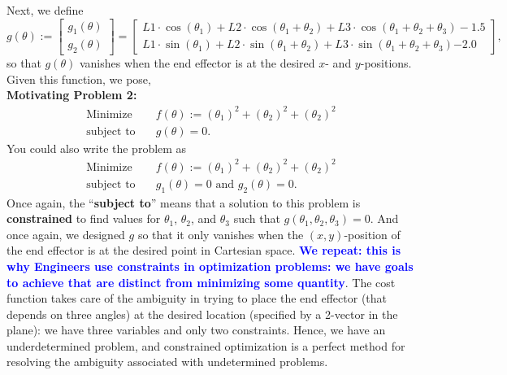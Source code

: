 Next, we define 
\begin{equation}
\label{eq:3LinkConstraintFull}
    g(\theta):=   \left[ \begin{array}{c} 
   g_1(\theta)\\  
    g_2(\theta)
    \end{array} \right] =
    \left[ \begin{array}{c} 
    L1 \cdot \cos(\theta_1) + L2 \cdot \cos(\theta_1 + \theta_2) + L3 \cdot \cos(\theta_1 + \theta_2 + \theta_3) -\bm{1.5}\\  
    L1 \cdot \sin(\theta_1) + L2 \cdot \sin(\theta_1 + \theta_2) + L3 \cdot \sin(\theta_1 + \theta_2 + \theta_3)  \bm{-2.0}
    \end{array} \right], 
\end{equation}
so that $g(\theta) $ vanishes when the end effector is at the desired $x$- and $y$-positions. Given this function, we pose,\\

\textbf{Motivating Problem 2:}
\begin{equation}
\label{eq:MotivatingProblem2ConstrainedOptimization}
\begin{aligned}
\text{Minimize} \quad & f(\theta) := (\theta_1)^2 +  (\theta_2)^2 +  (\theta_2)^2\\
\text{subject to} \quad & g(\theta) = 0.
\end{aligned}    
\end{equation}
You could also write the problem as 
\begin{equation}
\begin{aligned}
\text{Minimize} \quad & f(\theta) := (\theta_1)^2 +  (\theta_2)^2 +  (\theta_2)^2\\
\text{subject to} \quad & g_1(\theta) = 0 \text{ and } g_2(\theta) = 0.
\end{aligned}    
\end{equation}
Once again, the ``\textbf{subject to}'' means that a solution to this problem is \textbf{constrained} to find values for $\theta_1$, $\theta_2$, and $\theta_3$ such that $g(\theta_1, \theta_2, \theta_3) = 0$. And once again, we designed $g$ so that it only vanishes when the $(x, y)$-position of the end effector is at the desired point in Cartesian space. \textcolor{blue}{\bf We repeat: this is why Engineers use constraints in optimization problems: we have goals to achieve that are distinct from minimizing some quantity}. The cost function takes care of the ambiguity in trying to place the end effector (that depends on three angles) at the desired location (specified by a 2-vector in the plane): we have three variables and only two constraints. Hence, we have an underdetermined problem, and constrained optimization is a perfect method for resolving the ambiguity associated with undetermined problems.

